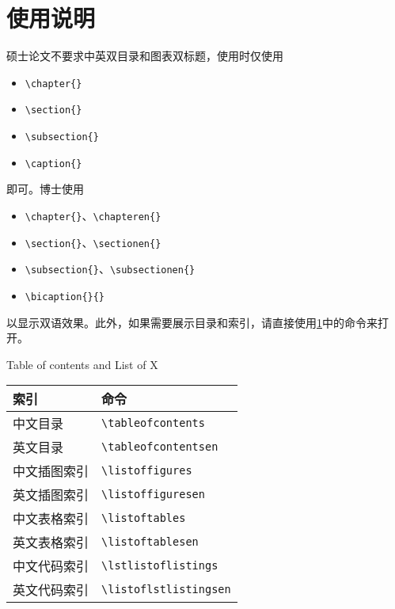 \section{使用说明}

硕士论文不要求中英双目录和图表双标题，使用时仅使用
\begin{itemize}
    \item \texttt{\textbackslash chapter\{\}}
    \item \texttt{\textbackslash section\{\}}
    \item \texttt{\textbackslash subsection\{\}}
    \item \texttt{\textbackslash caption\{\}}
\end{itemize}
即可。博士使用
\begin{itemize}
    \item \texttt{\textbackslash chapter\{\}}、\texttt{\textbackslash chapteren\{\}}
    \item \texttt{\textbackslash section\{\}}、\texttt{\textbackslash sectionen\{\}}
    \item \texttt{\textbackslash subsection\{\}}、\texttt{\textbackslash subsectionen\{\}}
    \item \texttt{\textbackslash bicaption\{\}\{\}}
\end{itemize}
以显示双语效果。此外，如果需要展示目录和索引，请直接使用\ref{tab:listof}中的命令来打开。
\begin{table}[!htp]
    {Table of contents and  List of X}
    \label{tab:listof}
    \centering
    \begin{tabular}{ll}
        \toprule
        索引    & 命令 \\
        \midrule
        中文目录    &  \texttt{\textbackslash tableofcontents} \\
        英文目录    &  \texttt{\textbackslash tableofcontentsen} \\
        中文插图索引    &  \texttt{\textbackslash listoffigures} \\
        英文插图索引    &  \texttt{\textbackslash listoffiguresen} \\
        中文表格索引   &  \texttt{\textbackslash listoftables} \\
        英文表格索引   &  \texttt{\textbackslash listoftablesen} \\
        中文代码索引   &  \texttt{\textbackslash lstlistoflistings} \\
        英文代码索引   &  \texttt{\textbackslash listoflstlistingsen} \\
        \bottomrule
    \end{tabular}
\end{table}

